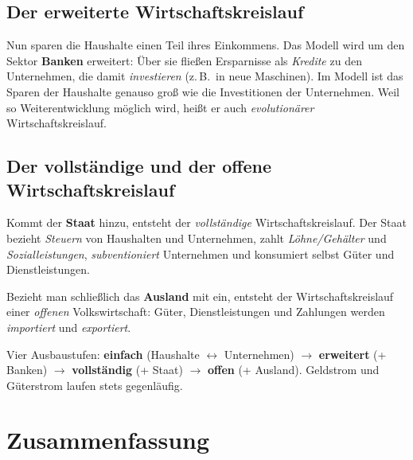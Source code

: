 \documentclass[11pt, a4paper]{article}
\begin{document}
\subsection{Der erweiterte Wirtschaftskreislauf}

Nun sparen die Haushalte einen Teil ihres Einkommens. Das Modell wird um den Sektor
\textbf{Banken} erweitert: Über sie fließen Ersparnisse als \emph{Kredite} zu den
Unternehmen, die damit \emph{investieren} (z.\,B.\ in neue Maschinen). Im Modell ist das
Sparen der Haushalte genauso groß wie die Investitionen der Unternehmen. Weil so
Weiterentwicklung möglich wird, heißt er auch \emph{evolutionärer} Wirtschaftskreislauf.

\subsection{Der vollständige und der offene Wirtschaftskreislauf}

Kommt der \textbf{Staat} hinzu, entsteht der \emph{vollständige} Wirtschaftskreislauf. Der
Staat bezieht \emph{Steuern} von Haushalten und Unternehmen, zahlt \emph{Löhne/Gehälter}
und \emph{Sozialleistungen}, \emph{subventioniert} Unternehmen und konsumiert selbst Güter
und Dienstleistungen.

Bezieht man schließlich das \textbf{Ausland} mit ein, entsteht der Wirtschaftskreislauf
einer \emph{offenen} Volkswirtschaft: Güter, Dienstleistungen und Zahlungen werden
\emph{importiert} und \emph{exportiert}.

\begin{merksatz}
Vier Ausbaustufen: \textbf{einfach} (Haushalte $\leftrightarrow$ Unternehmen) $\rightarrow$
\textbf{erweitert} (+ Banken) $\rightarrow$ \textbf{vollständig} (+ Staat) $\rightarrow$
\textbf{offen} (+ Ausland). Geldstrom und Güterstrom laufen stets gegenläufig.
\end{merksatz}

\section{Zusammenfassung}
\end{document}
